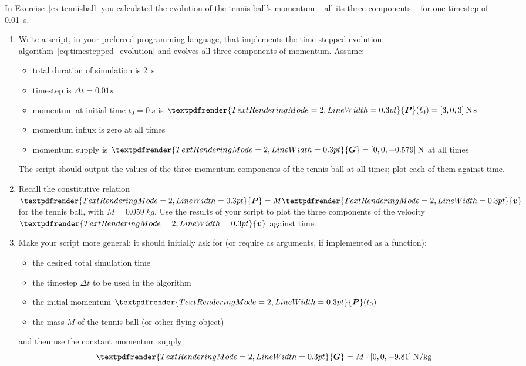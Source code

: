 \documentclass[a4paper,12pt,%
onecolumn,oneside,titlepage,%
british%
]{memoir}
\renewcommand*{\bm}[1]{\textpdfrender{TextRenderingMode=2,LineWidth=0.3pt}{\boldsymbol{#1}}}
\newcommand*{\incr}{\Delta}%
\renewcommand*{\|}[1][]{\nonscript\:#1\vert\nonscript\:\mathopen{}}
\newcommand*{\yv}{\bm{v}}
\newcommand*{\yM}{M}%
\newcommand*{\yP}{\bm{P}}
\newcommand*{\yG}{\bm{G}}
\newcommand*{\Dt}{\incr t}
\begin{document}
\begin{exercise}[label={ex:tennisball2}]
  In Exercise~\ref{ex:tennisball} you calculated the evolution of the tennis ball's momentum -- all its three components -- for one timestep of \qty{0.01}{s}.

  \begin{enumerate}[shift,label=\bfseries\arabic*.]
  \item Write a script, in your preferred programming language, that implements the time-stepped evolution algorithm~\eqref{eq:timestepped_evolution} and evolves all three components of momentum. Assume:
    \begin{itemize}\tightlist
    \item total duration of simulation is \qty{2}{s}
    \item timestep is $\Dt={0.01}{s}$
    \item momentum at initial time $t_{0}=\qty{0}{s}$ is $\yP(t_{0}) = [3,0,3]\:\unit{N\,s}$
    \item momentum influx is zero at all times
    \item  momentum supply is $\yG=[0,0,\num{-0.579}]\:\unit{N}$ at all times
    \end{itemize}
    The script should output the values of the three momentum components of the tennis ball at all times; plot each of them against time.

    \smallskip

  \item Recall the constitutive relation $\yP=\yM\yv$ for the tennis ball, with $\yM = \qty{0.059}{kg}$. Use the results of your script to plot the three components of the velocity $\yv$ against time.

    \smallskip

  \item Make your script more general: it should initially ask for (or require as arguments, if implemented as a function):
    \begin{itemize}\tightlist
    \item the desired total simulation time
    \item the timestep $\Dt$ to be used in the algorithm
    \item the initial momentum $\yP(t_{0})$
    \item the mass $\yM$ of the tennis ball (or other flying object)
    \end{itemize}
    and then use the constant momentum supply
    \begin{equation*}
      \yG = \yM\cdot [0,0,-9.81]\:\unit{N/kg}
    \end{equation*}
  \end{enumerate}
\end{exercise}
\end{document}
